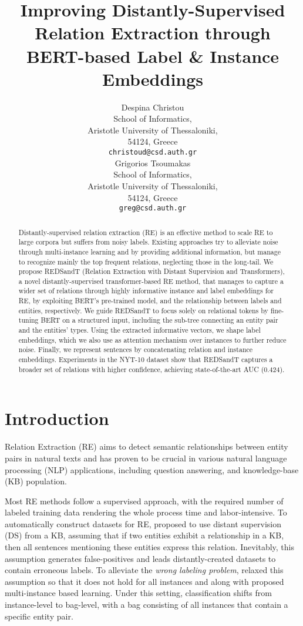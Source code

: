 \documentclass[11pt,a4paper]{article}
\title{Improving Distantly-Supervised Relation Extraction through BERT-based Label \& Instance Embeddings}
\author{Despina Christou \\
  School of Informatics, \\
  Aristotle University of Thessaloniki, \\
  54124, Greece\\
  \texttt{christoud@csd.auth.gr} \\
  \And
  Grigorios Tsoumakas \\
  School of Informatics, \\
  Aristotle University of Thessaloniki,\\
  54124, Greece\\
  \texttt{greg@csd.auth.gr} \\}
\date{}
\begin{document}
\maketitle





\begin{abstract}
    Distantly-supervised relation extraction (RE) is an effective method to scale RE to large corpora but suffers from noisy labels. Existing approaches try to alleviate noise through multi-instance learning and by providing additional information, but manage to recognize mainly the top frequent relations, neglecting those in the long-tail. We propose REDSandT (Relation Extraction with Distant Supervision and Transformers), a novel distantly-supervised transformer-based RE method, that manages to capture a wider set of relations through highly informative instance and label embeddings for RE, by exploiting BERT's pre-trained model, and the relationship between labels and entities, respectively. We guide REDSandT to focus solely on relational tokens by fine-tuning BERT on a structured input, including the sub-tree connecting an entity pair and the entities' types. Using the extracted informative vectors, we shape label embeddings, which we also use as attention mechanism over instances to further reduce noise. Finally, we represent sentences by concatenating relation and instance embeddings. Experiments in the NYT-10 dataset show that REDSandT captures a broader set of relations with higher confidence, achieving state-of-the-art AUC (0.424). 
\end{abstract}

\section{Introduction}
\label{intro}
Relation Extraction (RE) aims to detect semantic relationships between entity pairs in natural texts and has proven to be crucial in various natural language processing (NLP) applications, including question answering, and knowledge-base (KB) population.

Most RE methods follow a supervised approach, with the required number of labeled training data rendering the whole process time and labor-intensive. To automatically construct datasets for RE, \cite{Mintz2009} proposed to use distant supervision (DS) from a KB, assuming that if two entities exhibit a relationship in a KB, then all sentences mentioning these entities express this relation. Inevitably, this assumption generates false-positives and leads distantly-created datasets to contain erroneous labels. To alleviate the \textit{wrong labeling problem}, \cite{Riedel2010} relaxed this assumption so that it does not hold for all instances and along with \cite{Hoffmann_2011, Surdeanu2012} proposed multi-instance based learning. Under this setting, classification shifts from instance-level to bag-level, with a bag consisting of all instances that contain a specific entity pair.
\end{document}
